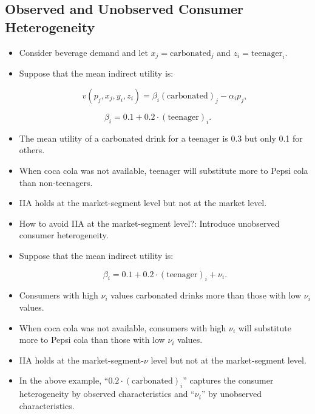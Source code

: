 \documentclass[]{book}
\providecommand{\tightlist}{%
  \setlength{\itemsep}{0pt}\setlength{\parskip}{0pt}}
\begin{document}
\subsection{Observed and Unobserved Consumer
Heterogeneity}\label{observed-and-unobserved-consumer-heterogeneity}

\begin{itemize}
\tightlist
\item
  Consider beverage demand and let \(x_j = \text{carbonated}_j\) and
  \(z_i = \text{teenager}_i\).
\item
  Suppose that the mean indirect utility is:

  \begin{equation}
  v(p_j, x_j, y_i, z_i) = \beta_i (\text{carbonated})_j - \alpha_i p_j,
  \end{equation}
\end{itemize}

\begin{equation}
\beta_i = 0.1 + 0.2 \cdot (\text{teenager})_i.
\end{equation}

\begin{itemize}
\item
  The mean utility of a carbonated drink for a teenager is 0.3 but only
  0.1 for others.
\item
  When coca cola was not available, teenager will substitute more to
  Pepsi cola than non-teenagers.
\item
  IIA holds at the market-segment level but not at the market level.
\item
  How to avoid IIA at the market-segment level?: Introduce unobserved
  consumer heterogeneity.
\item
  Suppose that the mean indirect utility is:

  \begin{equation}
  \beta_i = 0.1 + 0.2 \cdot (\text{teenager})_i + \nu_i.
  \end{equation}
\item
  Consumers with high \(\nu_i\) values carbonated drinks more than those
  with low \(\nu_i\) values.
\item
  When coca cola was not available, consumers with high \(\nu_i\) will
  substitute more to Pepsi cola than those with low \(\nu_i\) values.
\item
  IIA holds at the market-segment-\(\nu\) level but not at the
  market-segment level.
\item
  In the above example, ``\(0.2 \cdot (\text{carbonated})_i\)'' captures
  the consumer heterogeneity by observed characteristics and
  ``\(\nu_i\)'' by unobserved characteristics.
\end{itemize}
\end{document}
